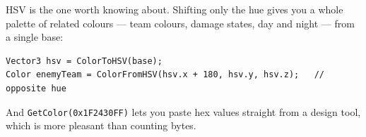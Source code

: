 HSV is the one worth knowing about. Shifting only the hue gives you a whole
palette of related colours --- team colours, damage states, day and night --- from
a single base:

\begin{lstlisting}
Vector3 hsv = ColorToHSV(base);
Color enemyTeam = ColorFromHSV(hsv.x + 180, hsv.y, hsv.z);   // opposite hue
\end{lstlisting}

And \lstinline|GetColor(0x1F2430FF)| lets you paste hex values straight from a
design tool, which is more pleasant than counting bytes.


